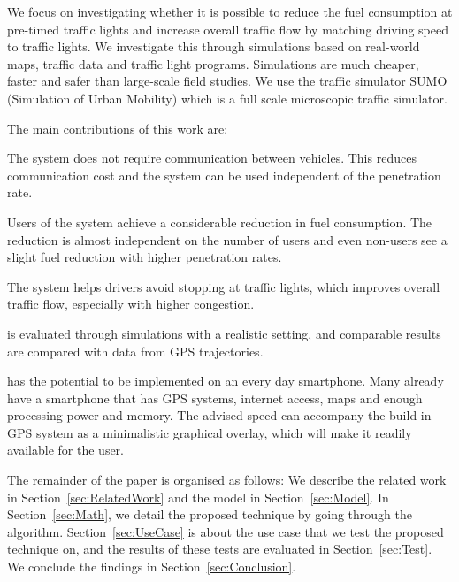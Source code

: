 We focus on investigating whether it is possible to reduce the fuel consumption at pre-timed traffic lights and increase overall traffic flow by matching driving speed to traffic lights. 
We investigate this through simulations based on real-world maps, traffic data and traffic light programs.
Simulations are much cheaper, faster and safer than large-scale field studies. 
We use the traffic simulator SUMO (Simulation of Urban Mobility)\cite{sumo} which is a full scale microscopic traffic simulator.

The main contributions of this work are:
\vspace{-4mm}
\begin{enumerate*}
\item The system does not require communication between vehicles. This reduces communication cost and the system can be used independent of the penetration rate.
\item Users of the system achieve a considerable reduction in fuel consumption. The reduction is almost independent on the number of users and even non-users see a slight fuel reduction with higher penetration rates.
\item The system helps drivers avoid stopping at traffic lights, which improves overall traffic flow, especially with higher congestion.
\item \tech is evaluated through simulations with a realistic setting, and comparable results are compared with data from GPS trajectories.
\end{enumerate*}

\tech has the potential to be implemented on an every day smartphone. 
Many already have a smartphone that has GPS systems, internet access, maps and enough processing power and memory.
The advised speed can accompany the build in GPS system as a minimalistic graphical overlay, which will make it readily available for the user.

The remainder of the paper is organised as follows: 
We describe the related work in Section~\ref{sec:RelatedWork} and the model in Section~\ref{sec:Model}. 
In Section~\ref{sec:Math}, we detail the proposed technique by going through the algorithm.
Section~\ref{sec:UseCase} is about the use case that we test the proposed technique on, and the results of these tests are evaluated in Section~\ref{sec:Test}. 
We conclude the findings in Section~\ref{sec:Conclusion}.




